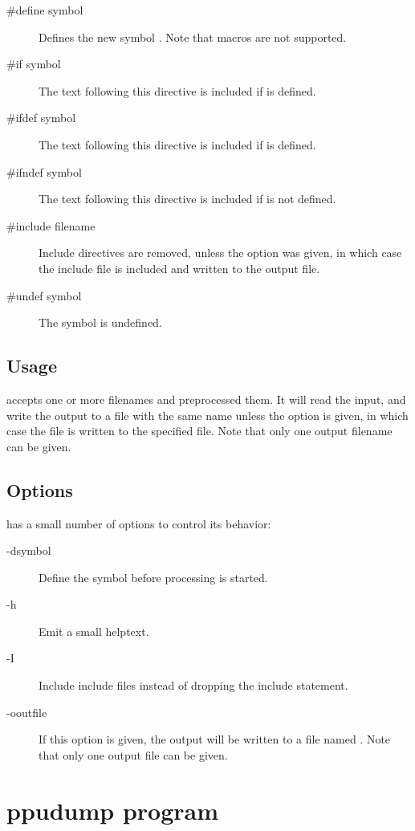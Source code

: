 \begin{description}
\item [\#define symbol] Defines the new symbol . Note that macros are not supported.
\item [\#if symbol] The text following this directive is included if  is defined.
\item [\#ifdef symbol] The text following this directive is included if  is defined.
\item [\#ifndef symbol] The text following this directive is included if  is not defined.
\item [\#include filename] Include directives are removed, unless the  option was given,
in which case the include file is included and written to the output file.
\item[\#undef symbol] The symbol  is undefined.
\end{description}

\subsection{Usage}
 accepts one or more filenames and preprocessed them.
It will read the input, and write the output to a file with the same name
unless the  option is given, in which case the file is written
to the specified file. Note that only one output filename can be given.


\subsection{Options}
 has a small number of options to control its behavior:
\begin{description}
\item[-dsymbol] Define the symbol  before processing is started.
\item[-h] Emit a small helptext.
\item[-I] Include include files instead of dropping the include statement.
\item[-ooutfile] If this option is given, the output will be written to a
file named . Note that only one output file can be given.
\end{description}

\section{ppudump program}

